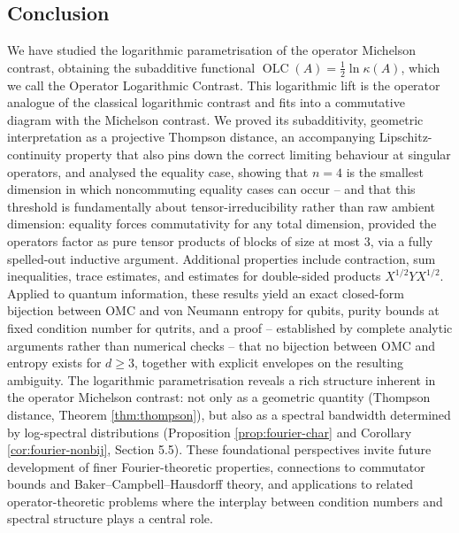 \documentclass{article}
\theoremstyle{remark}
\providecommand{\QLC}{\operatorname{OLC}}
\begin{document}
\subsection{Conclusion}
We have studied the logarithmic parametrisation of the operator Michelson contrast, obtaining the subadditive functional $\QLC(A)=\tfrac12\ln\kappa(A)$, which we call the Operator Logarithmic Contrast. This logarithmic lift is the operator analogue of the classical logarithmic contrast and fits into a commutative diagram with the Michelson contrast. We proved its subadditivity, geometric interpretation as a projective Thompson distance, an accompanying Lipschitz-continuity property that also pins down the correct limiting behaviour at singular operators, and analysed the equality case, showing that $n=4$ is the smallest dimension in which noncommuting equality cases can occur -- and that this threshold is fundamentally about tensor-irreducibility rather than raw ambient dimension: equality forces commutativity for any total dimension, provided the operators factor as pure tensor products of blocks of size at most $3$, via a fully spelled-out inductive argument. Additional properties include contraction, sum inequalities, trace estimates, and estimates for double-sided products $X^{1/2}YX^{1/2}$. Applied to quantum information, these results yield an exact closed-form bijection between OMC and von Neumann entropy for qubits, purity bounds at fixed condition number for qutrits, and a proof -- established by complete analytic arguments rather than numerical checks -- that no bijection between OMC and entropy exists for $d\ge3$, together with explicit envelopes on the resulting ambiguity. The logarithmic parametrisation reveals a rich structure inherent in the operator Michelson contrast: not only as a geometric quantity (Thompson distance, Theorem \ref{thm:thompson}), but also as a spectral bandwidth determined by log-spectral distributions (Proposition \ref{prop:fourier-char} and Corollary \ref{cor:fourier-nonbij}, Section 5.5). These foundational perspectives invite future development of finer Fourier-theoretic properties, connections to commutator bounds and Baker--Campbell--Hausdorff theory, and applications to related operator-theoretic problems where the interplay between condition numbers and spectral structure plays a central role.
\end{document}
